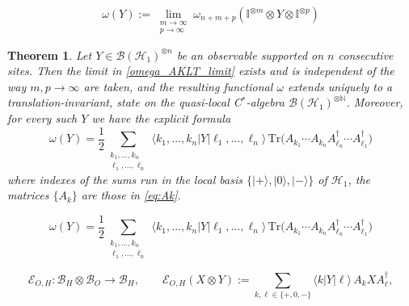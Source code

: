 \documentclass[10pt,a4paper]{amsart}
\newtheorem{theorem}{Theorem}
\def\Tr{\mathrm{Tr}}
\begin{document}
\begin{equation}\label{omega_AKLT_limit}
\omega(Y)
:=
\lim_{\substack{m\to\infty\\ p\to\infty}} \omega_{n+m+p}(\mathbb{I}^{\otimes m}\otimes Y\otimes\mathbb{I}^{\otimes p})
\end{equation}

\begin{theorem}\label{thm:AKLT_infinite_volume}
Let \(Y\in\mathcal{B}(\mathcal{H}_{1})^{\otimes n}\) be an observable supported on \(n\) consecutive sites. Then the limit in \eqref{omega_AKLT_limit} exists and is independent of the way \(m,p\to\infty\) are taken, and the resulting functional \(\omega\) extends uniquely to a translation-invariant,  state on the quasi-local C\(^*\)-algebra \(\mathcal{B}(\mathcal{H}_{1})^{\otimes\mathbb{N}}\). Moreover, for every such \(Y\) we have the explicit formula
\begin{equation}\label{eq:omega_infinite_formula_second_linear}
\omega(Y)
=
\frac{1}{2}\sum_{\substack{k_1,\dots,k_n\\ \ell_1,\dots,\ell_n}}
\langle k_1,\dots,k_n|Y|\ell_1,\dots,\ell_n\rangle\,
\Tr\!\bigl(
 A_{k_1}\cdots A_{k_n}A_{\ell_n}^{\dagger}\cdots A_{\ell_1}^{\dagger}
\bigr)
\end{equation}
where indexes of the sums run in the local  basis  \(\{|+\rangle,|0\rangle,|-\rangle\}\)  of \(\mathcal{H}_{1}\), the matrices \(\{A_k\}\) are those in \eqref{eq:Ak}.
\end{theorem}

\begin{equation}
\omega(Y)
=
\frac{1}{2}\sum_{\substack{k_1,\dots,k_n\\ \ell_1,\dots,\ell_n}}
\langle k_1,\dots,k_n|Y|\ell_1,\dots,\ell_n\rangle\,
\Tr\!\bigl(
 A_{k_1}\cdots A_{k_n}A_{\ell_n}^{\dagger}\cdots A_{\ell_1}^{\dagger}
\bigr)
\end{equation}

\begin{equation}\label{eq:EOH_def_HQMM}
\mathcal{E}_{O,H}:\mathcal{B}_H\otimes\mathcal{B}_O\to\mathcal{B}_H,
\qquad
\mathcal{E}_{O,H}(X\otimes Y)
:=
\sum_{k,\ell\in\{+,0,-\}}\langle k|Y|\ell\rangle\,A_k X A_{\ell}^{\dagger},
\end{equation}
\end{document}
